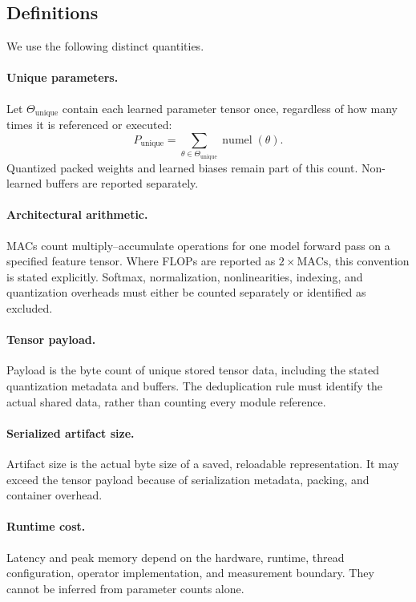 \documentclass[journal]{IEEEtran}
\begin{document}
\subsection{Definitions}

We use the following distinct quantities.

\paragraph{Unique parameters.}
Let $\Theta_{\mathrm{unique}}$ contain each learned parameter tensor
once, regardless of how many times it is referenced or executed:
\begin{equation}
P_{\mathrm{unique}}
=
\sum_{\theta\in\Theta_{\mathrm{unique}}}
\operatorname{numel}(\theta).
\end{equation}
Quantized packed weights and learned biases remain part of this
count.
Non-learned buffers are reported separately.

\paragraph{Architectural arithmetic.}
MACs count multiply--accumulate operations for one model forward
pass on a specified feature tensor.
Where FLOPs are reported as $2\times\mathrm{MACs}$, this convention
is stated explicitly.
Softmax, normalization, nonlinearities, indexing, and quantization
overheads must either be counted separately or identified as
excluded.

\paragraph{Tensor payload.}
Payload is the byte count of unique stored tensor data, including
the stated quantization metadata and buffers.
The deduplication rule must identify the actual shared data,
rather than counting every module reference.

\paragraph{Serialized artifact size.}
Artifact size is the actual byte size of a saved, reloadable
representation.
It may exceed the tensor payload because of serialization metadata,
packing, and container overhead.

\paragraph{Runtime cost.}
Latency and peak memory depend on the hardware, runtime,
thread configuration, operator implementation, and measurement
boundary.
They cannot be inferred from parameter counts alone.
\end{document}

